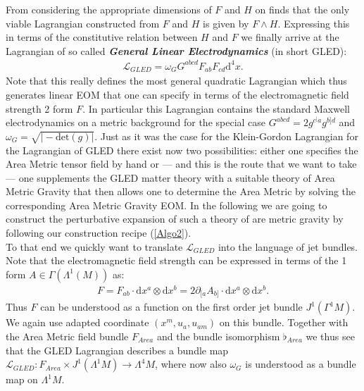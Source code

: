 \documentclass[a4paper,12pt, DIV=14, BCOR=5mm, twoside, headsepline, numbers=noenddot]{scrbook}
\begin{document}
From considering the appropriate dimensions of $F$ and $H$ on finds that the only viable Lagrangian constructed from $F$ and $H$ is given by $F \wedge H$. Expressing this in terms of the constitutive relation between $H$ and $F$ we finally arrive at the Lagrangian of so called \textbf{\textit{General Linear Electrodynamics}} (in short GLED):
\begin{align}
    \mathcal{L}_{GLED} = \omega_G G^{abcd}F_{ab}F_{cd}\mathrm{d}^4x.
\end{align}
Note that this really defines the most general quadratic Lagrangian which thus generates linear EOM that one can specify in terms of the  electromagnetic field strength 2 form $F$. In particular this Lagrangian contains the standard Maxwell electrodynamics on a metric background for the special case $G^{abcd} = 2 g^{c^[a}g^{b]d}$ and $\omega_{G}=\sqrt{\vert -\mathrm{det}(g) \vert}$. Just as it was the case for the Klein-Gordon Lagrangian for the Lagrangian of GLED there exist now two possibilities: either one specifies the Area Metric tensor field by hand or --- and this is the route that we want to take --- one supplements the GLED matter theory with a suitable theory of Area Metric Gravity that then allows one to determine the Area Metric by solving the corresponding Area Metric Gravity EOM. 
In the following we are going to construct the perturbative expansion of such a theory of are metric gravity by following our construction recipe (\ref{Algo2}).\\

To that end we quickly want to translate $\mathcal{L}_{GLED}$ into the language of jet bundles. Note that the electromagnetic field strength can be expressed in terms of the 1 form $A \in \Gamma(\Lambda^1(M))$ as:
\begin{align}
F = F_{ab} \cdot  \mathrm{d}x^a \otimes \mathrm{d}x^b = 2 \partial_{[a} A_{b]} \cdot \mathrm{d}x^a \otimes \mathrm{d}x^b.
\end{align}
Thus $F$ can be understood as a function on the first order jet bundle $J^1(\Gamma^1M)$. We again use adapted coordinate $(x^m,u_a,u_{am})$ on this bundle. Together with the Area Metric field bundle $F_{Area}$ and the bundle isomorphism $\flat_{Area}$ we thus see that the GLED Lagrangian describes a bundle map $\mathcal{L}_{GLED} : F_{Area} \times J^1(\Lambda^1M) \rightarrow \Lambda^4M $, where now also $\omega_G$ is understood as a bundle map on $\Lambda^1M$.  
\end{document}
